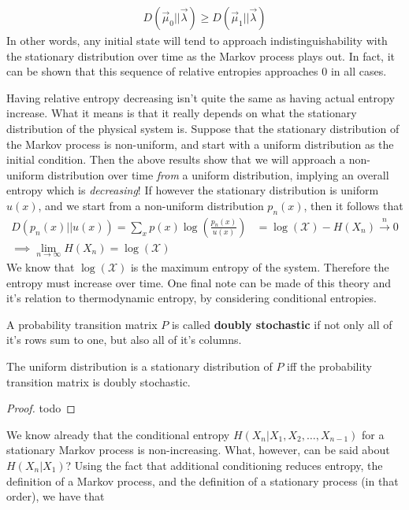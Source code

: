 \begin{align}
	D(\vec{\mu}_0||\vec{\lambda}) \geq D(\vec{\mu}_1||\vec{\lambda})
\end{align}
In other words, any initial state will tend to approach indistinguishability with the stationary distribution over time as the Markov process plays out. In fact, it can be shown that this sequence of relative entropies approaches $0$ in all cases. \par 
Having relative entropy decreasing isn't quite the same as having actual entropy increase. What it means is that it really depends on what the stationary distribution of the physical system is. Suppose that the stationary distribution of the Markov process is non-uniform, and start with a uniform distribution as the initial condition. Then the above results show that we will approach a non-uniform distribution over time \emph{from} a uniform distribution, implying an overall entropy which is \emph{decreasing}! If however the stationary distribution is uniform $u(x)$, and we start from a non-uniform distribution $p_n(x)$, then it follows that
\begin{align}
	D(p_n(x)||u(x)) = \sum_x p(x)\log\left( \frac{p_n(x)}{u(x)} \right) &= \log(\mathcal{X}) - H(X_n) \overset{n}{\to} 0 \\ \implies \lim_{n \to \infty} H(X_n) = \log(\mathcal{X})
\end{align}
We know that $\log(\mathcal{X})$ is the maximum entropy of the system. Therefore the entropy must increase over time. One final note can be made of this theory and it's relation to thermodynamic entropy, by considering conditional entropies.  
\begin{definition}
	A probability transition matrix $P$ is called \textbf{doubly stochastic} if not only all of it's rows sum to one, but also all of it's columns. 
\end{definition}
\begin{theorem}
	The uniform distribution is a stationary distribution of $P$ iff the probability transition matrix is doubly stochastic. 
\end{theorem}
\begin{proof}
	todo
\end{proof}
We know already that the conditional entropy $H(X_n|X_1,X_2,\ldots,X_{n-1})$ for a stationary Markov process is non-increasing. What, however, can be said about $H(X_n|X_1)$? Using the fact that additional conditioning reduces entropy, the definition of a Markov process, and the definition of a stationary process (in that order), we have that
